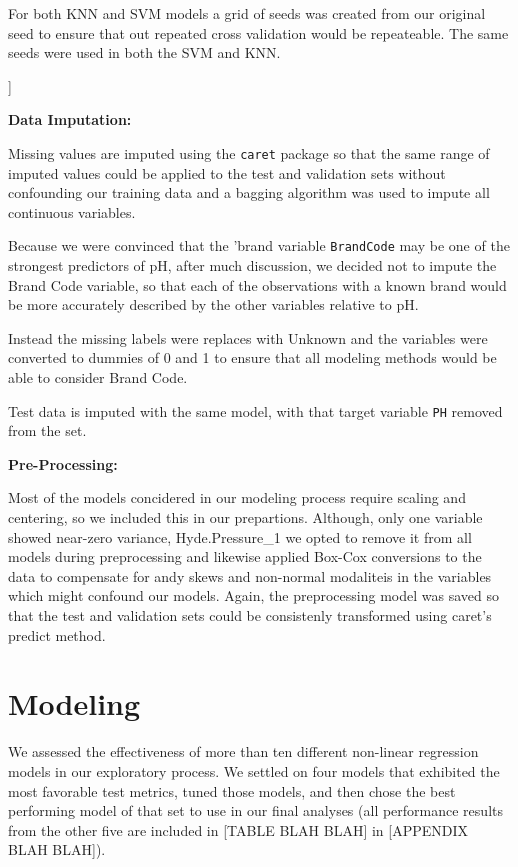 \documentclass[]{report}
\begin{document}
For both KNN and SVM models a grid of seeds was created from our
original seed to ensure that out repeated cross validation would be
repeateable. The same seeds were used in both the SVM and KNN.

{]}

\textbf{Data Imputation:}

Missing values are imputed using the \texttt{caret} package so that the
same range of imputed values could be applied to the test and validation
sets without confounding our training data and a bagging algorithm was
used to impute all continuous variables.

Because we were convinced that the 'brand variable \texttt{BrandCode}
may be one of the strongest predictors of pH, after much discussion, we
decided not to impute the Brand Code variable, so that each of the
observations with a known brand would be more accurately described by
the other variables relative to pH.

Instead the missing labels were replaces with Unknown and the variables
were converted to dummies of 0 and 1 to ensure that all modeling methods
would be able to consider Brand Code.

Test data is imputed with the same model, with that target variable
\texttt{PH} removed from the set.

\textbf{Pre-Processing:}

Most of the models concidered in our modeling process require scaling
and centering, so we included this in our prepartions. Although, only
one variable showed near-zero variance, Hyde.Pressure\_1 we opted to
remove it from all models during preprocessing and likewise applied
Box-Cox conversions to the data to compensate for andy skews and
non-normal modaliteis in the variables which might confound our models.
Again, the preprocessing model was saved so that the test and validation
sets could be consistenly transformed using caret's predict method.

\hypertarget{modeling}{%
\chapter{Modeling}\label{modeling}}

We assessed the effectiveness of more than ten different non-linear
regression models in our exploratory process. We settled on four models
that exhibited the most favorable test metrics, tuned those models, and
then chose the best performing model of that set to use in our final
analyses (all performance results from the other five are included in
{[}TABLE BLAH BLAH{]} in {[}APPENDIX BLAH BLAH{]}).
\end{document}
